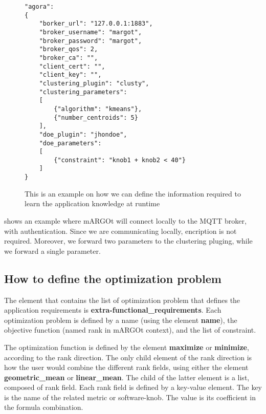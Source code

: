 \begin{figure}
\lstset{language=json}
\begin{lstlisting}
"agora":
{
	"borker_url": "127.0.0.1:1883",
	"broker_username": "margot",
	"broker_password": "margot",
	"broker_qos": 2,
	"broker_ca": "",
	"client_cert": "",
	"client_key": "",
	"clustering_plugin": "clusty",
	"clustering_parameters":
	[
		{"algorithm": "kmeans"},
		{"number_centroids": 5}
	],
	"doe_plugin": "jhondoe",
	"doe_parameters":
	[
		{"constraint": "knob1 + knob2 < 40"}
	]
}
\end{lstlisting}
\caption{This is an example on how we can define the information required to learn the application knowledge at runtime}
\label{code:agora}
\end{figure}


 shows an example where mARGOt will connect locally to the MQTT broker, with authentication.
Since we are communicating locally, encription is not required.
Moreover, we forward two parameters to the clustering pluging, while we forward a single parameter.




\subsection{How to define the optimization problem}
\label{ssec:agora_element}

The element that contains the list of optimization problem that defines the application requirements is \textbf{extra-functional\_requirements}.
Each optimization problem is defined by a name (using the element \textbf{name}), the objective function (named rank in mARGOt context), and the list of constraint.

The optimization function is defined by the element \textbf{maximize} or \textbf{minimize}, according to the rank direction.
The only child element of the rank direction is how the user would combine the different rank fields, using either the element \textbf{geometric\_mean} or \textbf{linear\_mean}.
The child of the latter element is a list, composed of rank field.
Each rank field is defined by a key-value element.
The key is the name of the related metric or software-knob.
The value is its coefficient in the formula combination.



